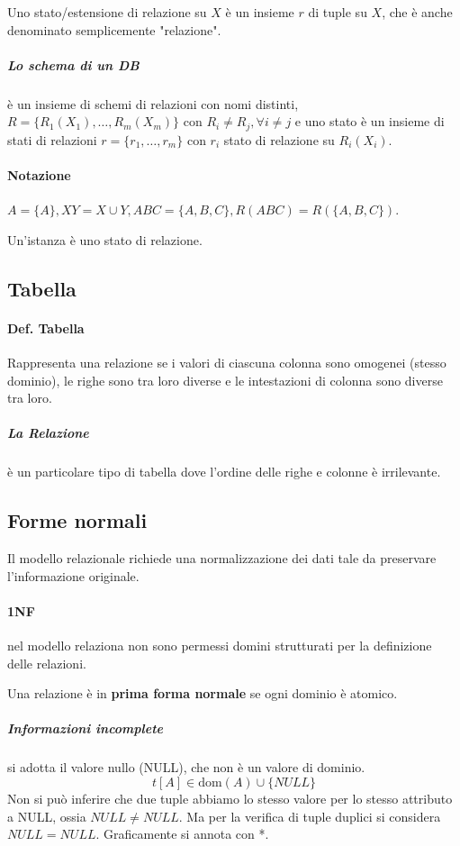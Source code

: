 Uno stato/estensione di relazione su $X$ è un insieme $r$ di tuple su $X$, che è anche denominato semplicemente "relazione".

\subparagraph{Lo schema di un DB} è un insieme di schemi di relazioni con nomi distinti, $R=\{R_1(X_1),\dots,R_m(X_m)\}$ con $R_i\ne R_j, \forall i \ne j$ e uno stato è un insieme di stati di relazioni $r=\{r_1,\dots, r_m\}$ con $r_i$ stato di relazione su $R_i(X_i)$.

\paragraph{Notazione} $A=\{A\}, XY=X\cup Y, ABC=\{A, B, C\}, R(ABC)=R(\{A, B, C\})$.

Un'istanza è uno stato di relazione.

\subsection{Tabella}
\paragraph{Def. Tabella} Rappresenta una relazione se i valori di ciascuna colonna sono omogenei (stesso dominio), le righe sono tra loro diverse e le intestazioni di colonna sono diverse tra loro.


\subparagraph{La Relazione} è un particolare tipo di tabella dove l'ordine delle righe e colonne è irrilevante.

\subsection{Forme normali}
Il modello relazionale richiede una normalizzazione dei dati tale da preservare l'informazione originale.

\paragraph{1NF} nel modello relaziona non sono permessi domini strutturati per la definizione delle relazioni.

Una relazione è in \textbf{prima forma normale} se ogni dominio è atomico.

\subparagraph{Informazioni incomplete} si adotta il valore nullo (NULL), che non è un valore di dominio. \[t[A]\in\mathrm{dom}(A)\cup\{NULL\}\]
Non si può inferire che due tuple abbiamo lo stesso valore per lo stesso attributo a NULL, ossia $NULL\ne NULL$. Ma per la verifica di tuple duplici si considera $NULL=NULL$. Graficamente si annota con *.

